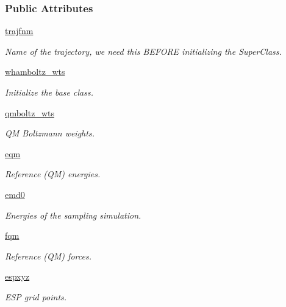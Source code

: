 \subsubsection*{Public Attributes}
\begin{DoxyCompactItemize}
\item 
\hyperlink{classforcebalance_1_1abinitio__internal_1_1AbInitio__Internal_a90351dc72b7faf3b8315a4734fea0812}{trajfnm}
\begin{DoxyCompactList}\small\item\em Name of the trajectory, we need this B\-E\-F\-O\-R\-E initializing the Super\-Class. \end{DoxyCompactList}\item 
\hyperlink{classforcebalance_1_1abinitio_1_1AbInitio_a885e7ef58b9e7c6abbc24321e5f3c61a}{whamboltz\-\_\-wts}
\begin{DoxyCompactList}\small\item\em Initialize the base class. \end{DoxyCompactList}\item 
\hyperlink{classforcebalance_1_1abinitio_1_1AbInitio_a06ec6b12d81791ca94f599f41e56335a}{qmboltz\-\_\-wts}
\begin{DoxyCompactList}\small\item\em Q\-M Boltzmann weights. \end{DoxyCompactList}\item 
\hyperlink{classforcebalance_1_1abinitio_1_1AbInitio_a64387fae9bdfb0d03ca6961e67c779be}{eqm}
\begin{DoxyCompactList}\small\item\em Reference (Q\-M) energies. \end{DoxyCompactList}\item 
\hyperlink{classforcebalance_1_1abinitio_1_1AbInitio_af928d333d14cb3b93f7db78530455873}{emd0}
\begin{DoxyCompactList}\small\item\em Energies of the sampling simulation. \end{DoxyCompactList}\item 
\hyperlink{classforcebalance_1_1abinitio_1_1AbInitio_af025be2ce97da3e8dc876d70e403f4ef}{fqm}
\begin{DoxyCompactList}\small\item\em Reference (Q\-M) forces. \end{DoxyCompactList}\item 
\hyperlink{classforcebalance_1_1abinitio_1_1AbInitio_a8be2d088afb344036aae989ca3cbcc41}{espxyz}
\begin{DoxyCompactList}\small\item\em E\-S\-P grid points. \end{DoxyCompactList}\item 

\end{DoxyCompactItemize}
